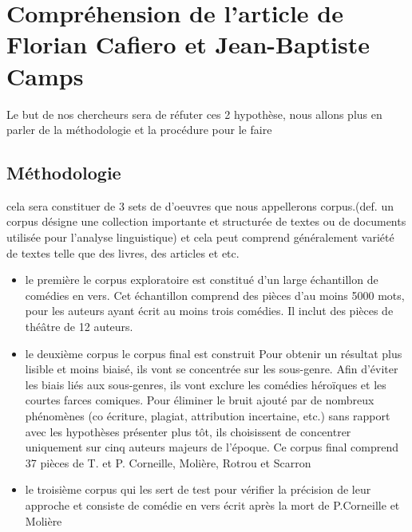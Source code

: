 \documentclass[]{report}
\begin{document}
\section{Compréhension de l'article de Florian Cafiero et Jean-Baptiste Camps}
\hspace{0,5 cm} Le but de nos chercheurs sera de réfuter ces 2 hypothèse, nous allons plus en parler de la méthodologie et la procédure pour le faire

\subsection{Méthodologie}
\vspace{\baselineskip}
\hspace{0,5cm} cela sera constituer de 3 sets de d'oeuvres que nous appellerons corpus.(def. un corpus désigne une collection importante et structurée de textes ou de documents utilisée pour l'analyse linguistique) et cela peut comprend généralement variété de textes telle que des livres, des articles et etc.  
\begin{itemize}
	\item   le première le corpus exploratoire est constitué d'un large échantillon de comédies en vers. Cet échantillon comprend des pièces d'au moins 5000 mots, pour les auteurs ayant écrit au moins trois comédies. Il inclut des pièces de théâtre de 12 auteurs.
	
	\item   le deuxième corpus  le corpus final est construit  Pour obtenir un résultat plus lisible et moins biaisé, ils vont se concentrée sur les sous-genre. Afin d'éviter les biais liés aux sous-genres, ils vont exclure les comédies héroïques et les courtes farces comiques. Pour éliminer le bruit ajouté par de nombreux phénomènes (co écriture, plagiat, attribution incertaine, etc.) sans rapport avec les hypothèses présenter plus tôt, ils choisissent de concentrer uniquement sur cinq auteurs majeurs de l'époque. Ce corpus final comprend 37 pièces de T. et P. Corneille, Molière, Rotrou et Scarron
	
	\item le troisième corpus qui les sert de test pour vérifier la précision de leur approche
	et consiste de comédie en vers écrit après la mort de P.Corneille et Molière	
\end{itemize}
\end{document}
